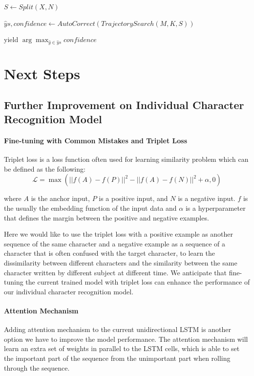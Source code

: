 \documentclass{article}
\begin{document}
\begin{multicols*}{2}
\begin{algorithm}[H]
$S \leftarrow Split(X, N)$

$\hat{y}s, confidence \leftarrow AutoCorrect (TrajectorySearch(M, K,S))$

yield $\arg \max_{\hat{y} \in \hat{y}s} confidence$

\end{algorithm}

\section{Next Steps}

\subsection{Further Improvement on Individual Character Recognition Model}

\paragraph{Fine-tuning with Common Mistakes and Triplet Loss}
Triplet loss \cite{triplet, triplet2} is a loss function often used for learning similarity problem which can be defined as the following:
$$\mathcal{L} = \max(||f(A) - f(P)||^2-||f(A) - f(N)||^2 + \alpha, 0)$$

where $A$ is the anchor input, $P$ is a positive input, and $N$ is a negative input. $f$ is the usually the embedding function of the input data and $\alpha$ is a hyperparameter that defines the margin between the positive and negative examples.

Here we would like to use the triplet loss with a positive example as another sequence of the same character and a negative example as a sequence of a character that is often confused with the target character, to learn the dissimilarity between different characters and the similarity between the same character written by different subject at different time. We anticipate that fine-tuning the current trained model with triplet loss can enhance the performance of our individual character recognition model.

\paragraph{Attention Mechanism} Adding attention mechanism to the current unidirectional LSTM is another option we have to improve the model performance. The attention mechanism will learn an extra set of weights in parallel to the LSTM cells, which is able to set the important part of the sequence from the unimportant part when rolling through the sequence.


\end{multicols*}
\end{document}
